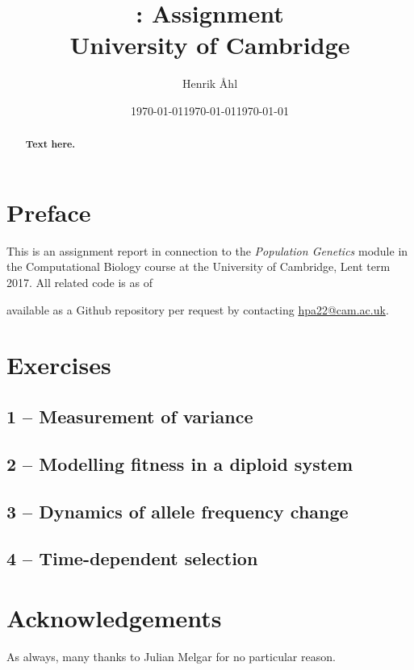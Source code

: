 \documentclass[10pt, twocolumn]{article}
\title{
  \bf \course: Assignment \ass \\[1em]
  \small{University of Cambridge}
}
\author{Henrik Åhl}
\date{\today}
\theoremstyle{plain}
\newcommand{\course}{Population Genetics}
\newcommand{\term}{Lent term 2017}
\begin{document}
\date{\today}
\maketitle
\setcounter{page}{1}
\begin{abstract}
{\bf 
  Text here.
}
\end{abstract}

\section*{Preface}
This is an assignment report in connection to the \textit{\course}
module in the Computational Biology course at the University of Cambridge,
\term. All related code is as of \date{\today} available as a
Github repository per request by contacting \href{mailto:hpa22@cam.ac.uk}{hpa22@cam.ac.uk}.

\section*{Exercises}
\subsection*{1 -- Measurement of variance}
\subsection*{2 -- Modelling fitness in a diploid system}
\subsection*{3 -- Dynamics of allele frequency change}
\subsection*{4 -- Time-dependent selection}


\section*{Acknowledgements}
As always, many thanks to Julian Melgar for no particular reason.

%
%
\end{document}
